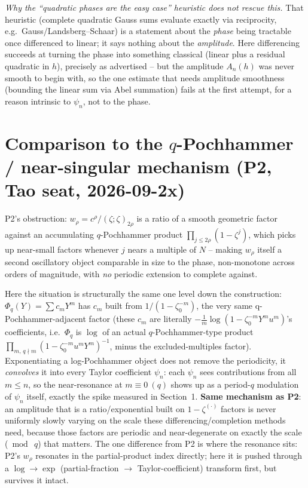 \documentclass[11pt]{article}
\begin{document}
\emph{Why the ``quadratic phases are the easy case'' heuristic does not rescue this.} That heuristic
(complete quadratic Gauss sums evaluate exactly via reciprocity, e.g.\ Gauss/Landsberg--Schaar) is a
statement about the \emph{phase} being tractable once differenced to linear; it says nothing about
the \emph{amplitude}. Here differencing succeeds at turning the phase into something classical
(linear plus a residual quadratic in $h$), precisely as advertised -- but the amplitude $A_n(h)$
was never smooth to begin with, so the one estimate that needs amplitude smoothness (bounding the
linear sum via Abel summation) fails at the first attempt, for a reason intrinsic to $\psi_n$, not
to the phase.

\section{Comparison to the $q$-Pochhammer / near-singular mechanism (P2, Tao seat, 2026-09-2x)}
P2's obstruction: $w_\rho=c^\rho/(\zeta;\zeta)_{2\rho}$ is a ratio of a smooth geometric factor
against an accumulating $q$-Pochhammer product $\prod_{j\le2\rho}(1-\zeta^j)$, which picks up
near-small factors whenever $j$ nears a multiple of $N$ -- making $w_\rho$ itself a second
oscillatory object comparable in size to the phase, non-monotone across orders of magnitude, with
\emph{no} periodic extension to complete against.

Here the situation is structurally the same one level down the construction: $\Phi_q(Y)=\sum
c_mY^m$ has $c_m$ built from $1/(1-\zeta_0^{-m})$, the very same q-Pochhammer-adjacent factor
(these $c_m$ are literally $-\tfrac1m\log(1-\zeta_0^{-m}Y^m u^m)$'s coefficients, i.e.\ $\Phi_q$ is
$\log$ of an actual $q$-Pochhammer-type product $\prod_{m,\,q\nmid m}(1-\zeta_0^{-m}u^mY^m)^{-1}$,
minus the excluded-multiples factor). Exponentiating a log-Pochhammer object does not remove the
periodicity, it \emph{convolves} it into every Taylor coefficient $\psi_n$: each $\psi_n$ sees
contributions from all $m\le n$, so the near-resonance at $m\equiv0\ (q)$ shows up as a period-$q$
modulation of $\psi_n$ itself, exactly the spike measured in Section~1. \textbf{Same mechanism as
P2}: an amplitude that is a ratio/exponential built on $1-\zeta^{(\cdot)}$ factors is never
uniformly slowly varying on the scale these differencing/completion methods need, because those
factors are periodic and near-degenerate on exactly the scale ($\bmod\ q$) that matters. The one
difference from P2 is where the resonance sits: P2's $w_\rho$ resonates in the partial-product index
directly; here it is pushed through a $\log\to\exp$ (partial-fraction $\to$ Taylor-coefficient)
transform first, but survives it intact.
\end{document}
